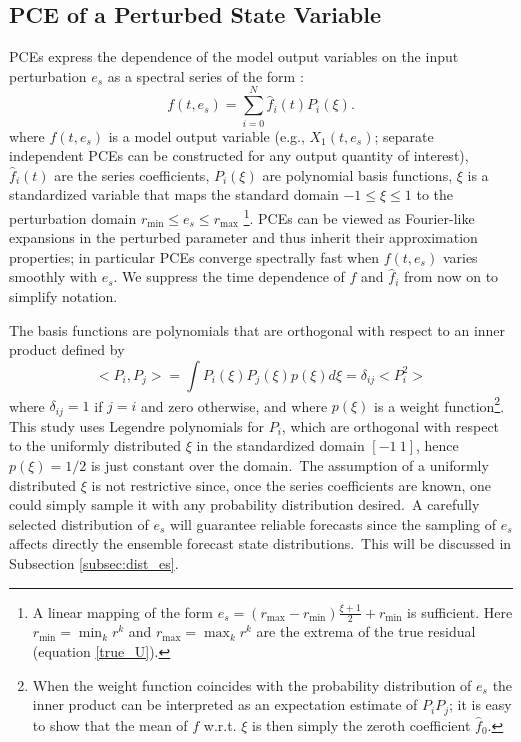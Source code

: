 		\subsection{ PCE of a Perturbed State Variable} 
		PCEs express the dependence of the model output variables
		on the input perturbation $e_s$ as a
		spectral series of the form {\citep{Maitre10}}:
		\begin{equation} \label{pce_compact}
			f(t,e_s) = \sum\limits_{ i=0 }^N \hat{f}_i(t)  P_i(\xi).
		\end{equation}
		where $f(t,e_s)$ is a model output variable (e.g., $X_1(t,e_s)$; separate independent PCEs can be
                constructed for any output quantity of interest),
		$\hat{f}_i(t)$ are the series coefficients,
		$P_i(\xi)$ are polynomial basis functions, 
                 $\xi$ is a standardized variable that maps the standard domain $-1\le\xi\le 1$ to the
		perturbation domain $r_{\min}\le e_s\le r_{\max}$
		\footnote{A linear mapping of the form $e_s = (r_{\max}-r_{\min}) \frac{\xi + 1}{2}+r_{\min}$ is sufficient. Here 
			$r_{\min}= \min_k r^k$ and $r_{\max} = \max_k r^k$ are the extrema of the true residual (equation \ref{true_U}).}.
		PCEs can be viewed as Fourier-like expansions in 
		the perturbed parameter and thus inherit their approximation properties; in particular PCEs
                converge spectrally fast when $f(t,e_s)$ varies smoothly with $e_s$.
		We suppress the time dependence of $f$ and $\hat{f}_i$ from now on to simplify notation.

			The basis functions are polynomials that
			are orthogonal with respect to an inner product defined by
			\begin{equation} \label{orthogonality}
				 \big< P_i,  P_j \big> 
				 = \int P_i(\xi) 
				 	P_j({\xi}) p(\xi) d\xi 
				 = \delta_{ij} \big< P_i^2 \big>
			\end{equation}
			where $\delta_{ij} = 1$ if $j=i$ and zero otherwise, and where $p(\xi)$ is a weight
			function\footnote{When the weight function coincides with the probability 
			distribution of $e_s$ the inner product can be interpreted as an expectation estimate of 
			$P_i P_j$; it is easy to show that the mean of $f$ w.r.t. $\xi$ is then simply the zeroth coefficient 
                        $\hat{f}_0$.}.
			This study uses Legendre polynomials for $P_i$, which are orthogonal 
			with respect to the uniformly distributed $\xi$ in the standardized domain $[-1 \ 1]$, 
			hence $p(\xi)=1/2$ is just constant over the domain.\
			The assumption of a uniformly distributed $\xi$ is not restrictive since, once the
			series coefficients are known, one could simply sample it with any 
			probability distribution desired.\ 
			A carefully selected distribution of $e_s$ will guarantee reliable forecasts
			since the sampling of $e_s$ affects directly the ensemble forecast state distributions.\
			This will be discussed in Subsection \ref{subsec:dist_es}.
			
